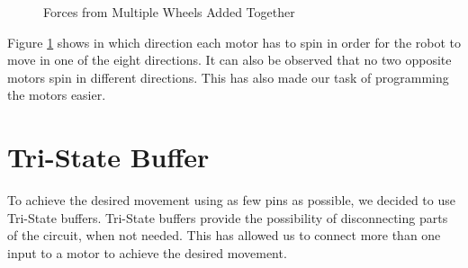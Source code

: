 \begin{figure}[htp]
\begin{center}
{    }
    \end{center}
    \begin{center}
	\end{center}
  	\caption{Forces from Multiple Wheels Added Together}
  	\label{fig:forces}
\end{figure}
Figure \ref{fig:forces} shows in which direction each motor has to spin in order for the robot to move in one of the eight directions. It can also be observed that no two opposite motors spin in different directions. This has also made our task of programming the motors easier. 
\clearpage
\section{Tri-State Buffer}To achieve the desired movement using as few pins as possible, we decided to use Tri-State buffers. Tri-State buffers provide the possibility of disconnecting parts of the circuit, when not needed. This has allowed us to connect more than one input to a motor to achieve the desired movement.

